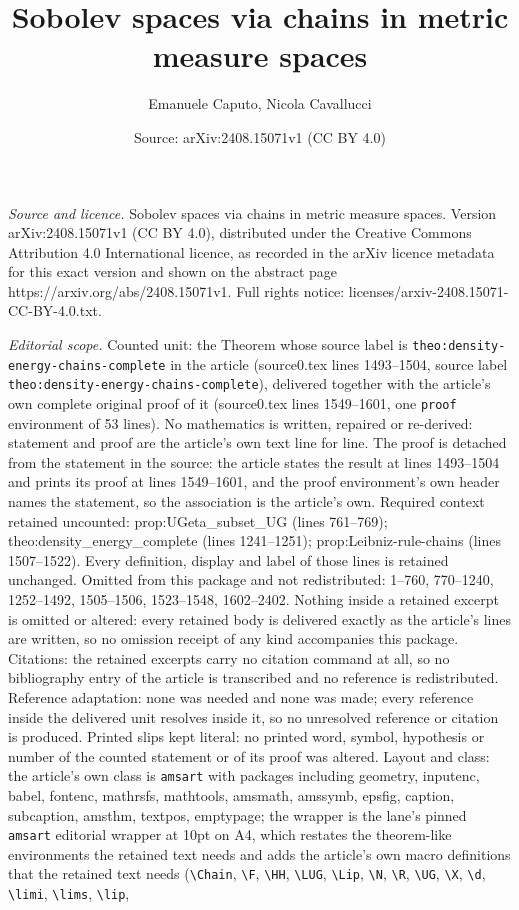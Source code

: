 \documentclass[10pt,a4paper]{amsart}
\title[Sobolev spaces via chains in metric measure spaces]{Sobolev spaces via chains in metric measure spaces}
\author{Emanuele Caputo, Nicola Cavallucci}
\date{Source: arXiv:2408.15071v1 (CC BY 4.0)}
\begin{document}
\maketitle

\noindent\emph{Source and licence.} Sobolev spaces via chains in metric measure spaces. Version arXiv:2408.15071v1 (CC BY 4.0), distributed under the Creative Commons Attribution 4.0 International licence, as recorded in the arXiv licence metadata for this exact version and shown on the abstract page https://arxiv.org/abs/2408.15071v1. Full rights notice: licenses/arxiv-2408.15071-CC-BY-4.0.txt.\par\smallskip

\noindent\textit{Editorial scope.} Counted unit: the Theorem whose source label is \texttt{theo:density-energy-chains-complete} in the article (source0.tex lines 1493--1504, source label \texttt{theo:density-energy-chains-complete}), delivered together with the article's own complete original proof of it (source0.tex lines 1549--1601, one \texttt{proof} environment of 53 lines). No mathematics is written, repaired or re-derived: statement and proof are the article's own text line for line. The proof is detached from the statement in the source: the article states the result at lines 1493--1504 and prints its proof at lines 1549--1601, and the proof environment's own header names the statement, so the association is the article's own. Required context retained uncounted: prop:UGeta\_subset\_UG (lines 761--769); theo:density\_energy\_complete (lines 1241--1251); prop:Leibniz-rule-chains (lines 1507--1522). Every definition, display and label of those lines is retained unchanged. Omitted from this package and not redistributed: 1--760, 770--1240, 1252--1492, 1505--1506, 1523--1548, 1602--2402. Nothing inside a retained excerpt is omitted or altered: every retained body is delivered exactly as the article's lines are written, so no omission receipt of any kind accompanies this package. Citations: the retained excerpts carry no citation command at all, so no bibliography entry of the article is transcribed and no reference is redistributed. Reference adaptation: none was needed and none was made; every reference inside the delivered unit resolves inside it, so no unresolved reference or citation is produced. Printed slips kept literal: no printed word, symbol, hypothesis or number of the counted statement or of its proof was altered. Layout and class: the article's own class is \texttt{amsart} with packages including geometry, inputenc, babel, fontenc, mathrsfs, mathtools, amsmath, amssymb, epsfig, caption, subcaption, amsthm, textpos, emptypage; the wrapper is the lane's pinned \texttt{amsart} editorial wrapper at 10pt on A4, which restates the theorem-like environments the retained text needs and adds the article's own macro definitions that the retained text needs (\texttt{\textbackslash Chain}, \texttt{\textbackslash F}, \texttt{\textbackslash HH}, \texttt{\textbackslash LUG}, \texttt{\textbackslash Lip}, \texttt{\textbackslash N}, \texttt{\textbackslash R}, \texttt{\textbackslash UG}, \texttt{\textbackslash X}, \texttt{\textbackslash d}, \texttt{\textbackslash limi}, \texttt{\textbackslash lims}, \texttt{\textbackslash lip}, 
\end{document}
